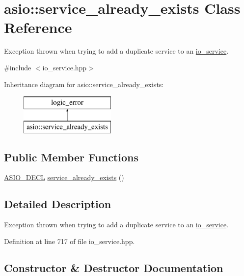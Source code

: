\hypertarget{classasio_1_1service__already__exists}{}\section{asio\+:\+:service\+\_\+already\+\_\+exists Class Reference}
\label{classasio_1_1service__already__exists}


Exception thrown when trying to add a duplicate service to an \hyperlink{classasio_1_1io__service}{io\+\_\+service}.  




{\ttfamily \#include $<$io\+\_\+service.\+hpp$>$}

Inheritance diagram for asio\+:\+:service\+\_\+already\+\_\+exists\+:\begin{figure}[H]
\begin{center}
\leavevmode
\includegraphics[height=2.000000cm]{classasio_1_1service__already__exists}
\end{center}
\end{figure}
\subsection*{Public Member Functions}
\begin{DoxyCompactItemize}
\item 
\hyperlink{config_8hpp_ab54d01ea04afeb9a8b39cfac467656b7}{A\+S\+I\+O\+\_\+\+D\+E\+C\+L} \hyperlink{classasio_1_1service__already__exists_ab25b77cfea1d716066f8000274fc5f01}{service\+\_\+already\+\_\+exists} ()
\end{DoxyCompactItemize}


\subsection{Detailed Description}
Exception thrown when trying to add a duplicate service to an \hyperlink{classasio_1_1io__service}{io\+\_\+service}. 

Definition at line 717 of file io\+\_\+service.\+hpp.



\subsection{Constructor \& Destructor Documentation}
\hypertarget{classasio_1_1service__already__exists_ab25b77cfea1d716066f8000274fc5f01}{}
